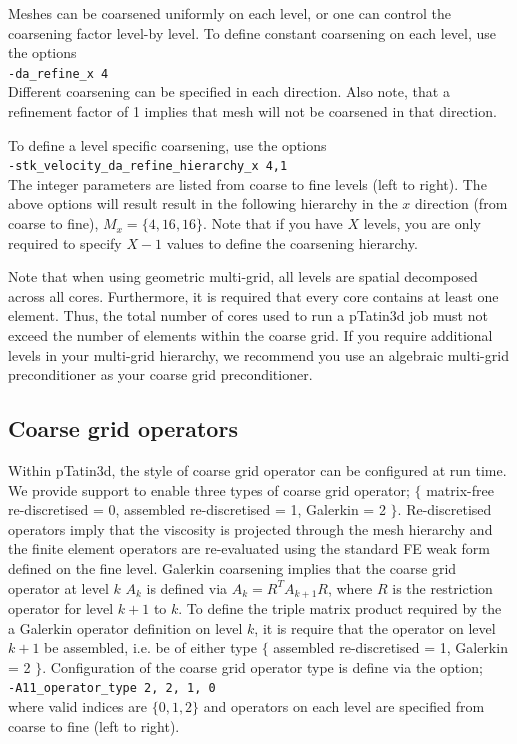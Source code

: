 \documentclass[paper=a4, fontsize=11pt,twoside]{scrartcl}
\newcommand{\ptat}{{pTatin3d}}
\newcommand{\shellcmd}[1]{\\\indent\indent\texttt{\hspace{5mm}\footnotesize #1}\\}
\begin{document}
{{Meshes can be coarsened uniformly on each level, or one can control the coarsening factor level-by level.
To define constant coarsening on each level, use the options
\shellcmd{-da\_refine\_x 4}
Different coarsening can be specified in each direction.
Also note, that a refinement factor of 1 implies that mesh will not be coarsened in that direction. 

To define a level specific coarsening, use the options
\shellcmd{-stk\_velocity\_da\_refine\_hierarchy\_x 4,1}
The integer parameters are listed from coarse to fine levels (left to right). The above options will result result in the following hierarchy in the $x$ direction (from coarse to fine), $M_x = \{ 4, 16, 16 \}$.
Note that if you have $X$ levels, you are only required to specify $X-1$ values to define the coarsening hierarchy. 


Note that when using geometric multi-grid, all levels are spatial decomposed across all cores. Furthermore, it is required that every core contains at least one element. Thus, the total number of cores used to run a {\ptat} job must not exceed the number of elements within the coarse grid. If you require additional levels in your multi-grid hierarchy, we recommend you use an algebraic multi-grid preconditioner as your coarse grid preconditioner.

\subsection{Coarse grid operators}
Within {\ptat}, the style of coarse grid operator can be configured at run time. We provide support to enable three types of coarse grid operator; $\{$ matrix-free re-discretised = 0, assembled re-discretised = 1, Galerkin = 2 $\}$. Re-discretised operators imply that the viscosity is projected through the mesh hierarchy and the finite element operators are re-evaluated using the standard FE weak form defined on the fine level. Galerkin coarsening implies that the coarse grid operator at level $k$ $A_k$ is defined via $A_k = R^T A_{k+1} R$, where $R$ is the restriction operator for level $k+1$ to $k$. To define the triple matrix product required by the a Galerkin operator definition on level $k$, it is require that the operator on level $k+1$ be assembled, i.e. be of either type $\{$ assembled re-discretised = 1, Galerkin = 2 $\}$. Configuration of the coarse grid operator type is define via the option;
\shellcmd{-A11\_operator\_type 2, 2, 1, 0}
where valid indices are $\{ 0, 1, 2 \}$ and operators on each level are specified from coarse to fine (left to right).



}}
\end{document}
